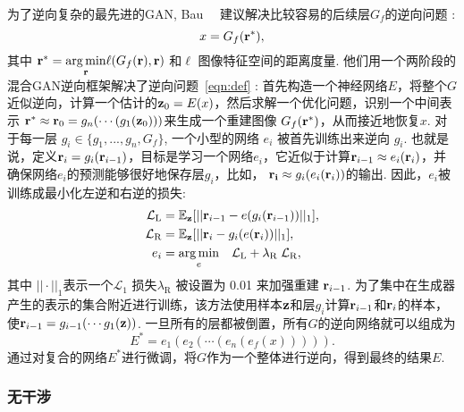 为了逆向复杂的最先进的GAN, Bau~\etal~\cite{bau2019seeing} 建议解决比较容易的后续层$G_f$的逆向问题 :
\begin{equation}
x = G_f(\rr^{*}),
\label{eqn:ganseeing}
\end{equation}
其中 $\mathbf{r}^{*} = \underset{\mathbf{r}}{\arg\min} \ell(G_f(\mathbf{r}), \mathbf{r})$ 和$\ell$ 图像特征空间的距离度量. 
他们用一个两阶段的混合GAN逆向框架解决了逆向问题~\eqref{eqn:def} : 首先构造一个神经网络$E$，将整个$G$近似逆向，计算一个估计的$\mathbf{z}_0 = E(x)$，然后求解一个优化问题，识别一个中间表示 $\mathbf{r}^* \approx \mathbf{r}_0 = g_n(\cdots(g_1(\mathbf{z}_0)))$来生成一个重建图像 $G_f(\mathbf{r}^*)$，从而接近地恢复$x$.
对于每一层 $g_i \in \{g_1,...,g_n, G_f\}$, 一个小型的网络 $e_i$ 被首先训练出来逆向 $g_i$. 
也就是说，定义$\mathbf{r}_i = g_i(\mathbf{r}_{i-1})$，目标是学习一个网络$e_i$，它近似于计算$\mathbf{r}_{i-1} \approx e_i(\mathbf{r}_{i})$，并确保网络$e_i$的预测能够很好地保存层$g_i$，比如， $\mathbf{r_{i}} \approx g_i(e_i(\mathbf{r}_{i}))$的输出.
因此，$e_i$被训练成最小化左逆和右逆的损失:
\begin{equation}
\begin{aligned}
\mathcal{L}_{\text{L}} & = \mathbb{E}_{\mathbf{z}}[||\mathbf{r}_{i-1}- e(g_i(\mathbf{r}_{i-1}))||_1], \\
\mathcal{L}_{\text{R}} & = \mathbb{E}_{\mathbf{z}}[||\mathbf{r}_i - g_i(e(\mathbf{r}_i))||_1],\\
e_i & = \underset{e}{\arg\min}\quad \mathcal{L}_{\text{L}} + \lambda_{\text{R}}\; \mathcal{L}_{\text{R}},
\end{aligned}
\end{equation}
其中 $||\cdot||_1$表示一个$\mathcal{L}_1$ 损失$\lambda_{\text{R}}$ 被设置为 0.01 来加强重建 $\mathbf{r}_{i-1}$.
为了集中在生成器产生的表示的集合附近进行训练，该方法使用样本$\mathbf{z}$和层$g_i$计算$\mathbf{r}_{i-1}$和$\mathbf{r}_i$的样本，使$\mathbf{r}_{i-1} = g_{i-1}(\cdots g_1(\mathbf{z}))$.
一旦所有的层都被倒置，所有$G$的逆向网络就可以组成为
\begin{equation}
{E}^{*}= e_1(e_2(\cdots(e_n(e_f(x))))).
\end{equation}
通过对复合的网络$E^*$进行微调，将$G$作为一个整体进行逆向，得到最终的结果$E$.

\subsubsection{无干涉}
\label{sec:non-inference}


